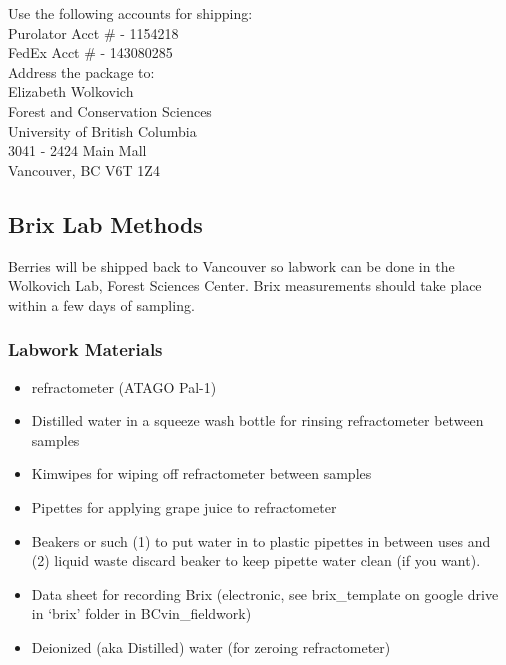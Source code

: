 \documentclass[11pt,letter]{article}
\newenvironment{smitemize}{
\begin{itemize}
  \setlength{\itemsep}{0pt}
  \setlength{\parskip}{0.8pt}
  \setlength{\parsep}{0pt}}
{\end{itemize}
}
\begin{document}
Use the following accounts for shipping: \\
Purolator Acct \# - 1154218 \\
FedEx Acct \# - 143080285 \\

Address the package to: \\
Elizabeth Wolkovich \\
Forest and Conservation Sciences \\
University of British Columbia \\
3041 - 2424 Main Mall \\
Vancouver, BC V6T 1Z4 \\

\subsection{Brix Lab Methods}
Berries will be shipped back to Vancouver so labwork can be done in the Wolkovich Lab, Forest Sciences Center. Brix measurements should take place within a few days of sampling.

\subsubsection{Labwork Materials}
\begin{smitemize}
\item refractometer (ATAGO Pal-1) 
\item Distilled water in a squeeze wash bottle for rinsing refractometer between samples 
\item Kimwipes for wiping off refractometer between samples
\item Pipettes for applying grape juice to refractometer 
\item Beakers or such (1) to put water in to plastic pipettes in between uses and (2) liquid waste discard beaker to keep pipette water clean (if you want).
\item Data sheet for recording Brix (electronic, see brix\_template on google drive in ‘brix’ folder in BCvin\_fieldwork)
\item Deionized (aka Distilled) water (for zeroing refractometer)

\end{smitemize}
\end{document}

